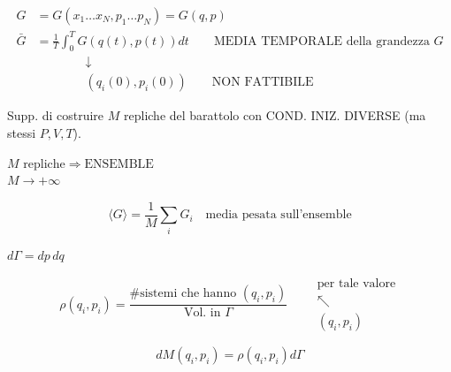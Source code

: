 \documentclass[12pt,a4paper]{article}
\begin{document}
\vspace{0.5cm}
\begin{align*}
    G &= G(x_1 \dots x_N, p_1 \dots p_N) = G(q, p) \\
    \bar{G} &= \frac{1}{T} \int_0^T G(q(t), p(t)) dt \qquad \text{MEDIA TEMPORALE della grandezza } G \\
    & \qquad\qquad \downarrow \\
    & \qquad\qquad (q_i(0), p_i(0)) \qquad \text{NON FATTIBILE}
\end{align*}

\vspace{0.5cm}
\noindent Supp. di costruire $M$ repliche del barattolo con COND. INIZ. DIVERSE (ma stessi $P, V, T$).


\vspace{0.3cm}
\noindent $M \text{ repliche} \Rightarrow \text{ENSEMBLE}$ \\
$M \rightarrow +\infty$

\vspace{0.5cm}
\begin{equation*}
    \boxed{ \langle G \rangle = \frac{1}{M} \sum_i G_i } \quad \text{media pesata sull'ensemble}
\end{equation*}

\vspace{0.5cm}

\noindent $d\Gamma = dp \, dq$

\begin{equation*}
    \rho(q_i, p_i) = \frac{\# \text{sistemi che hanno } (q_i, p_i)}{\text{Vol. in } \Gamma} \qquad \begin{matrix} \text{per tale valore} \\ \nwarrow \\ (q_i, p_i) \end{matrix}
\end{equation*}

\begin{equation*}
    dM(q_i, p_i) = \rho(q_i, p_i) d\Gamma
\end{equation*}
\end{document}
